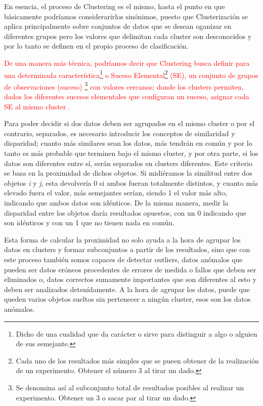 \documentclass[3p,twocolumn]{elsarticle}
\begin{document}
En esencia, el proceso de Clustering es el mismo, hasta el punto en que básicamente podríamos considerarirlos sinónimos, puesto que Clusterización se aplica principalmente sobre conjuntos de datos que se desean oganizar en diferentes grupos pero los valores que delimitan cada cluster son desconocidos y por lo tanto se definen en el propio proceso de clasificación.

\textcolor{Red} {De una manera más técnica, podríamos decir que Clustering busca definir para una determinada característica\footnote{Dicho de una cualidad que da carácter o sirve para distinguir a algo o alguien de sus semejante.} o Suceso Elemental\footnote{Cada uno de los resultados más simples que se pueen obtener de la realización de un experimento. Obtener el número 3 al tirar un dado.} (SE), un conjunto de grupos de observaciones (suceso) \footnote{Se denomina así al subconjunto total de resultados posibles al realizar un experimento. Obtener un 3 o sacar par al tirar un dado.} con valores cercanos; donde los clusters permiten, dados los diferentes sucesos elementales que configuran un suceso, asignar cada SE al mismo cluster \cite{8}.}

Para poder decidir si dos datos deben ser agrupados en el mismo cluster o por el contrario, separados, es necesario introducir los conceptos de similaridad y disparidad; cuanto más similares sean los datos, más tendrán en común y por lo tanto es más probable que terminen bajo el mismo cluster, y por otra parte, si los datos son diferentes entre sí, serán separados en clusters diferentes. Este criterio se basa en la proximidad de dichos objetos. Si midiéramos la similitud entre dos objetos \textit{i} y \textit{j}, esta devolvería 0 si ambos fueran totalmente distintos, y cuanto más elevado fuera el valor, más semejantes serían, siendo 1 el valor más alto, indicando que ambos datos son idénticos. De la misma manera, medir la disparidad entre los objetos daría resultados opuestos, con un 0 indicando que son idénticos y con un 1 que no tienen nada en común. 

Esta forma de calcular la proximidad no solo ayuda a la hora de agrupar los datos en clusters y formar subconjuntos a partir de los resultados, sino que con este proceso también somos capaces de detectar outliers, datos anómalos que pueden ser datos eróneos procedentes de errores de medida o fallos que deben ser eliminados o, datos correctos sumamente importantes que son diferentes al esto y deben ser analizados detenídamente. A la hora de agrupar los datos, puede que queden varios objetos sueltos sin pertenecer a ningún cluster, esos son los datos anómalos.
\end{document}
